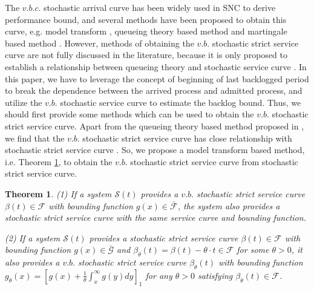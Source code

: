 \documentclass[paper]{ieice}
\newtheorem{theorem}{Theorem}
\begin{document}
The $v.b.c.$ stochastic arrival curve has been widely used in SNC to derive performance bound, and several methods have been proposed to obtain this curve, e.g. model transform \cite{jiang2006basic,Wu2010Model,JiangLiu-15877}, queueing theory based method \cite{Wu2010Model} and martingale based method \cite{jiang2010note}. However, methods of obtaining the $v.b.$ stochastic strict service curve are not fully discussed in the literature, because it is only proposed to establish a relationship between queueing theory and stochastic service curve \cite{Wu2010Model}. In this paper, we have to leverage the concept of beginning of last backlogged period to break the dependence between the arrived process and admitted process, and utilize the $v.b.$ stochastic service curve to estimate the backlog bound. Thus, we should first provide some methods which can be used to obtain the $v.b.$ stochastic strict service curve. Apart from the queueing theory based method proposed in \cite{Wu2010Model}, we find that the $v.b.$ stochastic strict service curve has close relationship with stochastic strict service curve \cite{JiangLiu-15877}. So, we propose a model transform based method, i.e. Theorem \ref{mtrans}, to obtain the $v.b.$ stochastic strict service curve from stochastic strict service curve.
\begin{theorem}\label{mtrans}
(1) If a system $\mathcal{S}(t)$ provides a $v.b.$ stochastic strict service curve $\beta(t)\in\mathcal{F}$ with bounding function $g(x)\in\bar{\mathcal{F}}$, the system also provides a stochastic strict service curve with the same service curve and bounding function.

(2) If a system $\mathcal{S}(t)$ provides a stochastic strict service curve $\beta(t)\in\mathcal{F}$ with bounding function $g(x)\in\bar{\mathcal{G}}$ and $\beta_{\theta}(t)=\beta(t)-\theta\cdot t\in\mathcal{F}$ for some $\theta>0$, it also provides a $v.b.$ stochastic strict service curve $\beta_{\theta}(t)$ with bounding function $g_{\theta}(x)=[g(x)+\frac{1}{\theta}\int_x^\infty g(y)dy]_1$ for any $\theta>0$ satisfying $\beta_{\theta}(t)\in\mathcal{F}$.
\end{theorem}
\end{document}
